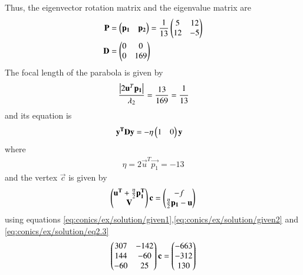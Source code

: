 \begin{enumerate}
%
Thus, the eigenvector rotation matrix and the eigenvalue matrix are
\begin{align}
\mathbf{P}&=\begin{pmatrix}\mathbf{p_1}&\mathbf{p_2}\end{pmatrix}=\frac{1}{13}\begin{pmatrix}5&12\\ 12 &-5\end{pmatrix} \\
\mathbf{D}&=\begin{pmatrix}0&0\\0&169\end{pmatrix}
\end{align}
The focal length of the parabola is given by 
\begin{align}
\frac{\left\vert2\mathbf{u}^T\mathbf{p_1}\right\vert}{\lambda_2}
    = \frac{13}{169}=\cfrac{1}{13}
\end{align}
and its equation is
\begin{align}
    \mathbf{y^T}\mathbf{D}\mathbf{y}&=-\eta\begin{pmatrix}1&0\end{pmatrix}\mathbf{y}\label{eq:conics/ex/solution/eq2.4}
\end{align}
where
\begin{align}
    \eta=2\vec{u}^T\vec{p_1}=-13
\end{align}
and the vertex $\vec{c}$ is given by 
\begin{align}
    \begin{pmatrix}\mathbf{u^T}+\frac{\eta}{2}\mathbf{p_1^T} \\ \mathbf{V}\end{pmatrix}\mathbf{c}=
    \begin{pmatrix}-f \\\frac{\eta}{2}\mathbf{p_1}-\mathbf{u}\end{pmatrix} 
\end{align}
using equations \eqref{eq:conics/ex/solution/given1},\eqref{eq:conics/ex/solution/given2} and \eqref{eq:conics/ex/solution/eq2.3}
\begin{align}
    \begin{pmatrix}307& -142 \\ 144 & -60 \\  -60 & 25 \end{pmatrix}\mathbf{c}=\begin{pmatrix}-663 \\ -312 \\ 130\end{pmatrix}
\end{align}


\end{enumerate}
